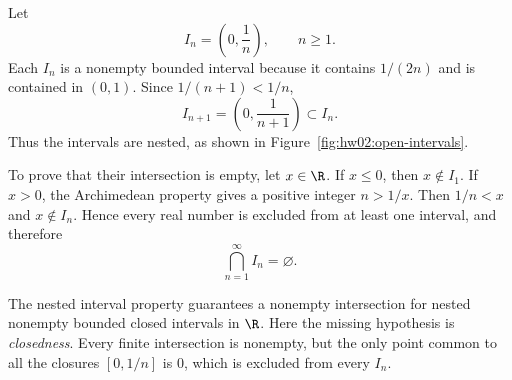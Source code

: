 Let
\[
  I_n=\left(0,\frac1n\right),\qquad n\geq1.
\]
Each $I_n$ is a nonempty bounded interval because it contains $1/(2n)$
and is contained in $(0,1)$. Since $1/(n+1)<1/n$,
\[
  I_{n+1}=\left(0,\frac1{n+1}\right)
    \subset I_n.
\]
Thus the intervals are nested, as shown in
Figure~\ref{fig:hw02:open-intervals}.
\begin{marginfigure}
  \centering
  
  \caption{The nested intervals $I_n=(0,1/n)$ exclude $0$.}
  \label{fig:hw02:open-intervals}
\end{marginfigure}

To prove that their intersection is empty, let $x\in\R$.
If $x\leq0$, then $x\notin I_1$. If $x>0$, the Archimedean
property gives a positive integer $n>1/x$.
Then $1/n<x$ and $x\notin I_n$.
Hence every real number is excluded from at least one interval,
and therefore
\[
  \bigcap_{n=1}^{\infty}I_n=\varnothing.
\]

The nested interval property guarantees a nonempty intersection
for nested nonempty bounded closed intervals in $\R$. Here the
missing hypothesis is \emph{closedness}. Every finite intersection
is nonempty, but the only point common to all the closures
$[0,1/n]$ is $0$, which is excluded from every $I_n$.
